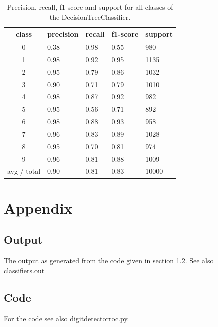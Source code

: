 \documentclass{scrartcl}
\begin{document}
\begin{table}[H]
\center
\begin{tabular}{c | llll}
           class &  precision   & recall   & f1-score   & support\\
            \hline
          0  &     0.38   &   0.98    &  0.55     &  980\\
          1  &     0.98   &   0.92    &  0.95     & 1135\\
          2  &     0.95   &   0.79    &  0.86     & 1032\\
          3  &     0.90   &   0.71    &  0.79     & 1010\\
          4  &     0.98   &   0.87    &  0.92     &  982\\
          5  &     0.95   &   0.56    &  0.71     &  892\\
          6  &     0.98   &   0.88    &  0.93     &  958\\
          7  &     0.96   &   0.83    &  0.89     & 1028\\
          8  &     0.95   &   0.70    &  0.81     &  974\\
          9  &     0.96   &   0.81    &  0.88     & 1009\\
          \hline
avg / total  &     0.90   &   0.81    &  0.83     & 10000\\
\end{tabular}
\caption{Precision, recall, f1-score and support for all classes of the DecisionTreeClassifier.}
\label{tab:dtree}
\end {table}




\section{Appendix}
\subsection{Output}
The output as generated from the code given in section \ref{sec:code}.
See also classifiers.out


\subsection{Code}
\label{sec:code}
For the code see also digitdetectorroc.py.




\end{document}
